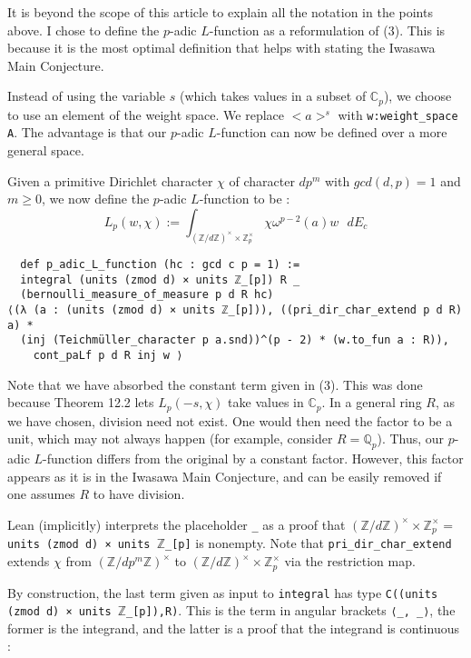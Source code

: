 \documentclass[a4paper,UKenglish,cleveref, autoref, thm-restate]{lipics-v2021}
\newcommand{\lean}[1]{\texttt{#1}\xspace} %
\begin{document}
It is beyond the scope of this article to explain all the notation in the points above. I chose to
define the $p$-adic $L$-function as a reformulation of (3). This is because it is the most optimal
definition that helps with stating the Iwasawa Main Conjecture. 

Instead of using the variable $s$ (which takes values in a subset of $\mathbb{C}_p$), we choose to use an element of the weight space. We replace
$<a>^s$ with \lean{w:weight\_space A}. The advantage is that our $p$-adic $L$-function can now be defined over a more general space. 

Given a primitive Dirichlet character $\chi$ of character $dp^m$ with $gcd(d, p) = 1$ and $m \ge 0$,
we now define the $p$-adic $L$-function to be :
$$ L_p(w, \chi) := \int_{(\mathbb{Z}/d \mathbb{Z})^{\times} \times \mathbb{Z}_p^{\times}}
\chi \omega^{p - 2} (a) w \text{    } dE_c $$

\begin{lstlisting}
  def p_adic_L_function (hc : gcd c p = 1) :=
  integral (units (zmod d) × units ℤ_[p]) R _ 
  (bernoulli_measure_of_measure p d R hc)
⟨(λ (a : (units (zmod d) × units ℤ_[p])), ((pri_dir_char_extend p d R) a) *
  (inj (Teichmüller_character p a.snd))^(p - 2) * (w.to_fun a : R)), 
    cont_paLf p d R inj w ⟩
\end{lstlisting}

Note that we have absorbed the constant term given in (3). This was done because Theorem 12.2 lets $L_p(-s, \chi)$ take values in $\mathbb{C}_p$. 
In a general ring $R$, as we have chosen, division need not exist. One would then need the factor to be a unit, which may not always happen 
(for example, consider $R = \mathbb{Q}_p$). Thus, our $p$-adic $L$-function differs from the original by a constant factor. 
However, this factor appears as it is in the Iwasawa Main Conjecture, and can be easily removed if one assumes $R$ to have division. 

Lean (implicitly) interprets the placeholder \lean{\_} as a proof that 
\newline $(\mathbb{Z}/d \mathbb{Z})^{\times} \times \mathbb{Z}_p^{\times} = $ \lean{units (zmod d) × units $\mathbb{Z}$\_[p]} is nonempty. 
Note that \lean{pri\_dir\_char\_extend} extends $\chi$
from $(\mathbb{Z}/ dp^m \mathbb{Z})^{\times}$ to $(\mathbb{Z}/ d \mathbb{Z})^{\times} \times \mathbb{Z}_p^{\times}$ via the restriction map. 

By construction, the last term given as input to \lean{integral} has type \newline \lean{C((units (zmod d) × units $\mathbb{Z}$\_[p]),R)}. 
This is the term in angular brackets \lean{⟨\_, \_⟩}, the former is the integrand, and the latter is a proof that the integrand is continuous : 
\end{document}
